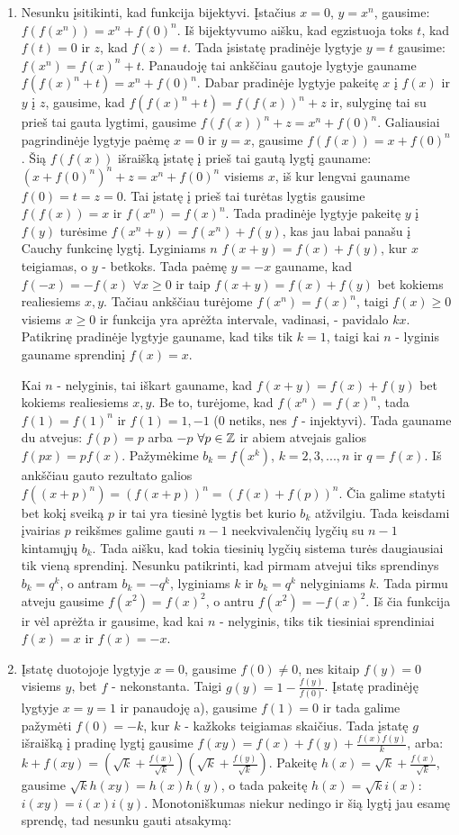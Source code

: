 \begin{enumerate}
\item 
Nesunku įsitikinti, kad funkcija bijektyvi. Įstačius $x=0$, $y=x^n$,
gausime: $f(f(x^n))=x^n+f(0)^n$. Iš bijektyvumo aišku, kad egzistuoja
toks $t$, kad  $f(t)=0$ ir $z$, kad  $f(z)=t$. Tada įsistatę pradinėje
lygtyje $y=t$ gausime: $f(x^n)=f(x)^n+t$. Panaudoję tai
ankščiau gautoje lygtyje gauname $f(f(x)^n+t)=x^n+f(0)^n$. Dabar pradinėje
lygtyje pakeitę $x$ į $f(x)$ ir $y$ į $z$, gausime, kad
$f(f(x)^n+t)=f(f(x))^n+z$ ir, sulyginę tai su prieš tai gauta lygtimi,
gausime $f(f(x))^n+z=x^n+f(0)^n$. Galiausiai pagrindinėje lygtyje
paėmę $x=0$ ir $y=x$, gausime $f(f(x))=x+f(0)^n$. Šią $f(f(x))$
išraišką įstatę į prieš tai gautą lygtį gauname:
$(x+f(0)^n)^n+z=x^n+f(0)^n$ visiems $x$, iš kur lengvai gauname
$f(0)=t=z=0$. Tai įstatę į prieš tai turėtas lygtis gausime $f(f(x))=x$
ir $f(x^n)=f(x)^n$. Tada pradinėje lygtyje pakeitę $y$ į $f(y)$
turėsime $f(x^n+y)=f(x^n)+f(y)$, kas jau labai panašu į Cauchy
funkcinę lygtį.  Lyginiams $n$ $f(x+y)=f(x)+f(y)$, kur $x$ teigiamas, o
$y$ - betkoks. Tada paėmę $y=-x$ gauname, kad $f(-x)=-f(x)$ $ \forall
x\geq 0$ ir taip $f(x+y)=f(x)+f(y)$ bet kokiems realiesiems $x,y$.
Tačiau ankščiau turėjome $f(x^n)=f(x)^n$, taigi $f(x)\geq 0$ visiems
$x\geq 0$ ir funkcija yra aprėžta intervale, vadinasi, - pavidalo $kx$.
Patikrinę pradinėje lygtyje gauname, kad tiks tik $k=1$, taigi kai $n$
- lyginis gauname sprendinį $f(x)=x$.

Kai $n$ - nelyginis, tai iškart gauname, kad $f(x+y)=f(x)+f(y)$ bet
kokiems realiesiems $x,y$. Be to, turėjome, kad $f(x^n)=f(x)^n$, tada
$f(1)=f(1)^n$ ir $f(1)=1,-1$ ($0$ netiks, nes $f$ - injektyvi). Tada
gauname du atvejus: $f(p)=p$ arba $-p$ $\forall p\in\mathbb Z$ ir abiem
atvejais galios $f(px)=pf(x)$. Pažymėkime $b_{k}=f(x^k)$,
$k=2,3,...,n$ ir $q=f(x)$. Iš ankščiau gauto rezultato galios
$f((x+p)^n)=(f(x+p))^n=(f(x)+f(p))^n$. Čia galime statyti bet kokį
sveiką $p$ ir tai yra tiesinė lygtis bet kurio  $b_{k}$ atžvilgiu. Tada
keisdami įvairias $p$ reikšmes galime gauti $n-1$ neekvivalenčių
lygčių su $n-1$ kintamųjų $b_{k}$. Tada aišku, kad tokia tiesinių
lygčių sistema turės daugiausiai tik vieną sprendinį. Nesunku
patikrinti, kad pirmam atvejui tiks sprendinys $b_{k}=q^k$, o antram
$b_{k}=-q^k$, lyginiams $k$ ir $b_{k}=q^k$ nelyginiams $k$. Tada pirmu
atveju gausime  $f(x^2)=f(x)^2$, o antru $f(x^2)=-f(x)^2$. Iš čia
funkcija ir vėl aprėžta ir gausime, kad kai $n$ - nelyginis, tiks tik
tiesiniai sprendiniai $f(x)=x$ ir $f(x)=-x$.
\item 
Įstatę duotojoje lygtyje $x=0$, gausime $f(0)\not=0$, nes kitaip
$f(y)=0$ visiems $y$, bet $f$ -  nekonstanta. Taigi
$g(y)=1-\frac{f(y)}{f(0)}$. Įstatę pradinėję lygtyje $x=y=1$ ir
panaudoję a), gausime $f(1)=0$ ir tada galime pažymėti $f(0)=-k$, kur
$k$ - kažkoks teigiamas skaičius. Tada įstatę $g$ išraišką į pradinę
lygtį gausime $f(xy)=f(x)+f(y)+\frac{f(x)f(y)}{k}$, arba:
$k+f(xy)=(\sqrt{k}+\frac{f(x)}{\sqrt{k}})(\sqrt{k}+\frac{f(y)}{\sqrt{k}})$.
Pakeitę $h(x)=\sqrt{k}+\frac{f(x)}{\sqrt{k}}$, gausime
$\sqrt{k}h(xy)=h(x)h(y)$, o tada pakeitę $h(x)=\sqrt{k}i(x)$:
$i(xy)=i(x)i(y)$. Monotoniškumas niekur nedingo ir šią lygtį jau esamę
sprendę, tad nesunku gauti atsakymą:


\end{enumerate}
